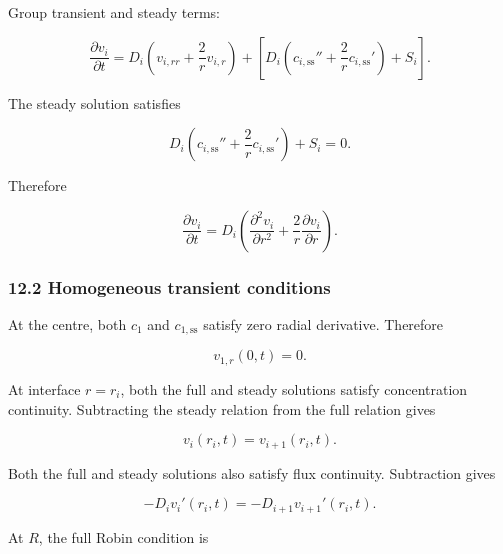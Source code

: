 \documentclass[11pt,a4paper]{article}
\begin{document}
Group transient and steady terms:

\begin{equation}
\frac{\partial v_i}{\partial t}
=
D_i
\left(
v_{i,rr}+\frac2r v_{i,r}
\right)
+
\left[
D_i
\left(
c_{i,\mathrm{ss}}''
+\frac2r c_{i,\mathrm{ss}}'
\right)
+
S_i
\right].
\tag{TRISO-ML-409}
\label{eq:triso-ml-409}
\end{equation}

The steady solution satisfies

\begin{equation}
D_i
\left(
c_{i,\mathrm{ss}}''
+\frac2r c_{i,\mathrm{ss}}'
\right)
+
S_i
=
0.
\tag{TRISO-ML-410}
\label{eq:triso-ml-410}
\end{equation}

Therefore

\begin{equation}
\boxed{
\frac{\partial v_i}{\partial t}
=
D_i
\left(
\frac{\partial^2v_i}{\partial r^2}
+
\frac2r\frac{\partial v_i}{\partial r}
\right).
}
\tag{TRISO-ML-411}
\label{eq:triso-ml-411}
\end{equation}

\subsubsection*{12.2 Homogeneous transient conditions}

At the centre, both $c_1$ and $c_{1,\mathrm{ss}}$ satisfy zero radial derivative. Therefore

\begin{equation}
\boxed{
v_{1,r}(0,t)=0.
}
\tag{TRISO-ML-412}
\label{eq:triso-ml-412}
\end{equation}

At interface $r=r_i$, both the full and steady solutions satisfy concentration continuity. Subtracting the steady relation from the full relation gives

\begin{equation}
\boxed{
v_i(r_i,t)=v_{i+1}(r_i,t).
}
\tag{TRISO-ML-413}
\label{eq:triso-ml-413}
\end{equation}

Both the full and steady solutions also satisfy flux continuity. Subtraction gives

\begin{equation}
\boxed{
-D_iv_i'(r_i,t)
=
-D_{i+1}v_{i+1}'(r_i,t).
}
\tag{TRISO-ML-414}
\label{eq:triso-ml-414}
\end{equation}

At $R$, the full Robin condition is
\end{document}
